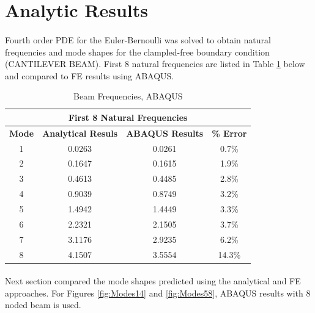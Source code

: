 \documentclass[12pt]{article}
\begin{document}
\maketitle

\section{Analytic Results}

\paragraph{}
Fourth order PDE for the Euler-Bernoulli was solved to obtain natural frequencies and mode shapes for the clampled-free boundary condition (CANTILEVER BEAM). First 8 natural frequencies are listed in Table \ref{tab:T1} below and compared to FE results using ABAQUS. 

\begin{table}[H]
  \centering
  \caption{Beam Frequencies, ABAQUS}
    \begin{tabular}{crrc}
    \toprule
    \multicolumn{4}{c}{\textbf{First 8 Natural Frequencies}} \\
    \midrule
    \textbf{Mode} & \textbf{Analytical Resuls} & \textbf{ABAQUS Results} & \textbf{\% Error} \\
    1     & \multicolumn{1}{c}{0.0263} & \multicolumn{1}{c}{0.0261} & 0.7\% \\
    2     & \multicolumn{1}{c}{0.1647} & \multicolumn{1}{c}{0.1615} & 1.9\% \\
    3     & \multicolumn{1}{c}{0.4613} & \multicolumn{1}{c}{0.4485} & 2.8\% \\
    4     & \multicolumn{1}{c}{0.9039} & \multicolumn{1}{c}{0.8749} & 3.2\% \\
    5     & \multicolumn{1}{c}{1.4942} & \multicolumn{1}{c}{1.4449} & 3.3\% \\
    6     & \multicolumn{1}{c}{2.2321} & \multicolumn{1}{c}{2.1505} & 3.7\% \\
    7     & \multicolumn{1}{c}{3.1176} & \multicolumn{1}{c}{2.9235} & 6.2\% \\
    8     & \multicolumn{1}{c}{4.1507} & \multicolumn{1}{c}{3.5554} & 14.3\% \\
    \bottomrule
    \end{tabular}%
  \label{tab:T1}%
\end{table}%

\paragraph{}
Next section compared the mode shapes predicted using the analytical and FE approaches. For Figures \ref{fig:Modes14} and \ref{fig:Modes58}, ABAQUS results with 8 noded beam is used.
\end{document}
